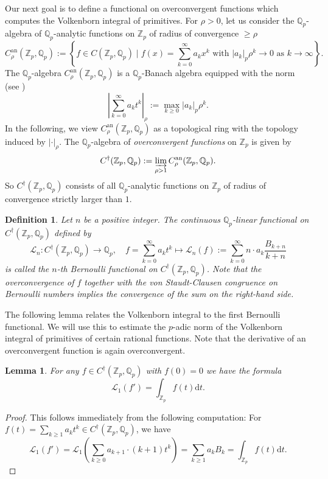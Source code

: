 \documentclass[12pt]{article}
\newtheorem{lemma}[theorem]{Lemma}
\newtheorem{definition}[theorem]{Definition}
\numberwithin{equation}{section}
\begin{document}
Our next goal is to define a functional on overconvergent functions which computes the Volkenborn integral of primitives. For $\rho>0$, let us consider the $\mathbb{Q}_p$-algebra of $\mathbb{Q}_p$-analytic functions on $\mathbb{Z}_p$ of radius of convergence $\geqslant\rho$ 
\[
	C^{\text{an}}_\rho(\mathbb{Z}_p,\mathbb{Q}_p):=\left\{ f\in C(\mathbb{Z}_p,\mathbb{Q}_p) \mid f(x)=\sum_{k=0}^\infty a_kx^k \text{ with } |a_k|_p\rho^k\to 0 \text{ as }k\to \infty \right\}.
\]
The $\mathbb{Q}_p$-algebra $C^{\text{an}}_\rho(\mathbb{Z}_p,\mathbb{Q}_p)$ is a $\mathbb{Q}_p$-Banach algebra equipped with the  norm (see \cite[\S 6.1.5]{BGR84})
\[
	\left|\sum_{k=0}^\infty a_kt^k\right|_\rho:=\max_{k \geqslant 0} |a_k|_p\rho^k.
\]
In the following, we view $C^{\text{an}}_\rho(\mathbb{Z}_p,\mathbb{Q}_p)$ as a topological ring with the topology induced by $|\cdot|_\rho$. 
The $\mathbb{Q}_p$-algebra of \emph{overconvergent functions} on $\mathbb{Z}_p$ is given by
\[
	C^{\dagger}(\mathbb{Z}_p,\mathbb{Q}_p):=\varinjlim_{\rho>1} C^{\text{an}}_\rho(\mathbb{Z}_p,\mathbb{Q}_p).
\]
So $C^{\dagger}(\mathbb{Z}_p,\mathbb{Q}_p)$ consists of all $\mathbb{Q}_p$-analytic functions on $\mathbb{Z}_p$ of radius of convergence strictly larger than $1$.

\begin{definition}
Let $n$ be a positive integer. The continuous $\mathbb{Q}_p$-linear functional on $C^{\dagger}(\mathbb{Z}_p,\mathbb{Q}_p)$ defined by
\[
	\mathcal{L}_n\colon C^{\dagger}(\mathbb{Z}_p,\mathbb{Q}_p)\to \mathbb{Q}_p,\quad f=\sum_{k=0}^\infty a_kt^k\mapsto \mathcal{L}_n(f) :=\sum_{k=0}^\infty n\cdot a_k \frac{B_{k+n}}{k+n}
\]
is called the \emph{$n$-th Bernoulli functional} on $C^{\dagger}(\mathbb{Z}_p,\mathbb{Q}_p)$.
Note that the overconvergence of $f$ together with the von Staudt-Clausen congruence on Bernoulli numbers implies the convergence of the sum on the right-hand side.
\end{definition}
The following lemma relates the Volkenborn integral to the first Bernoulli functional. We will use this to estimate the $p$-adic norm of the Volkenborn integral of primitives of certain rational functions. Note that the derivative of an overconvergent function is again overconvergent.
\begin{lemma}\label{lem:comparison_Volkenborn_Bernoulli}
    For any $f\in C^{\dagger}(\mathbb{Z}_p,\mathbb{Q}_p)$ with $f(0)=0$ we have the formula
    \begin{equation}\label{eq:comparison_Volkenborn_Bernoulli}
	   \mathcal{L}_1(f')=\int_{\mathbb{Z}_p} f(t) \mathrm{d}t.
    \end{equation}
\end{lemma}
\begin{proof}
This follows immediately from the following computation: For $f(t)=\sum_{k\geqslant 1} a_kt^k \in C^{\dagger}(\mathbb{Z}_p,\mathbb{Q}_p)$, we have
\[
\mathcal{L}_1(f')	= \mathcal{L}_1\left( \sum_{k\geqslant 0} a_{k+1}\cdot(k+1) t^k \right)=\sum_{k\geqslant 1}  a_{k} B_{k}=\int_{\mathbb{Z}_p} f(t) \mathrm{d}t.
\]
\end{proof}
\end{document}
